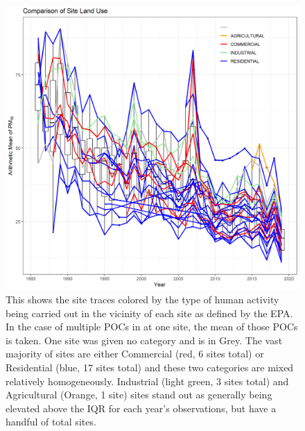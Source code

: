 \documentclass{article}
\begin{document}
\begin{figure}[ht]
    \centering
    \includegraphics[width = \textwidth]{Figures/SOCAB_metadata_Site_Land_use.png}
    \caption{This shows the site traces colored by the type of human activity being carried out in the vicinity of each site as defined by the EPA.  In the case of multiple \ac{POC}s in at one site, the mean of those \ac{POC}s is taken.  One site was given no category and is in Grey.  The vast majority of sites are either Commercial (red, 6 sites total) or Residential (blue, 17 sites total) and these two categories are mixed relatively homogeneously.  Industrial (light green, 3 sites total) and Agricultural (Orange, 1 site) sites stand out as generally being elevated above the IQR for each year's observations, but have a handful of total sites.}
    \label{fig:SOCAB_metadata_Site_Land_use}
\end{figure}
\end{document}
